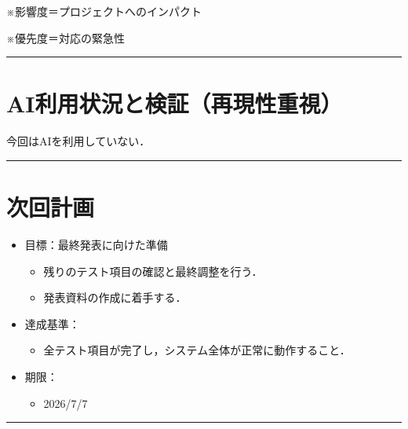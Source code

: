 \documentclass[uplatex,dvipdfmx,a4paper,11pt]{jsarticle}
\newcommand{\sectionrule}{\par\medskip\noindent\rule{\linewidth}{0.6pt}\par\medskip}
\begin{document}
\medskip
※影響度＝プロジェクトへのインパクト

※優先度＝対応の緊急性

\sectionrule


\section{AI利用状況と検証（再現性重視）}

今回はAIを利用していない．

\sectionrule


\section{次回計画}


\begin{itemize}

  \item 目標：最終発表に向けた準備
    \begin{itemize}
      \item 残りのテスト項目の確認と最終調整を行う．
      \item 発表資料の作成に着手する．
    \end{itemize}

  \item 達成基準：
    \begin{itemize}
      \item 全テスト項目が完了し，システム全体が正常に動作すること．
    \end{itemize}

  \item 期限：
    \begin{itemize}
      \item 2026/7/7
    \end{itemize}

\end{itemize}


\sectionrule
\end{document}
